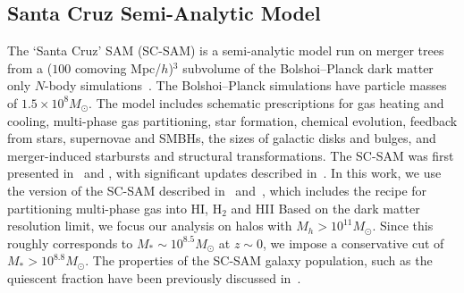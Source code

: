\documentclass[tighten, preprint]{aastex62}
\begin{document}
\subsection{Santa Cruz Semi-Analytic Model} \label{sec:scsam}
The `Santa Cruz' SAM (SC-SAM) is a semi-analytic model run on 
merger trees from a ($100$ comoving Mpc/$h$)$^3$ subvolume of the 
Bolshoi--Planck dark matter only $N$-body simulations~\citep{rodriguez-puebla2016}. 
The Bolshoi--Planck simulations have particle masses of $1.5 \times 10^8 M_\odot$. 
The model includes schematic prescriptions for gas heating and 
cooling, multi-phase gas partitioning, star formation, chemical 
evolution, feedback from stars, supernovae and SMBHs, the sizes 
of galactic disks and 
bulges, and merger-induced starbursts and structural transformations. 
The SC-SAM was first presented in~\cite{somerville1999} and 
\cite{somerville2001}, with significant updates described 
in~\cite{somerville2008, somerville2008a, somerville2012, porter2014, 
popping2014, somerville2015a}. In this work, we use the version of 
the SC-SAM described in~\cite{popping2014} and~\cite{somerville2015a}, 
{\color{red} which includes the \cite{gnedin2011} recipe for partitioning multi-phase
gas into HI, H$_2$ and HII %
Based on the dark matter resolution limit,}
we focus our analysis on halos with $M_h{>}10^{11} M_\odot$.
Since this roughly corresponds to $M_*{\sim}10^{8.5} M_\odot$ at 
$z\sim 0$, we impose a conservative cut of $M_* > 10^{8.8}M_\odot$. 
The properties of the SC-SAM galaxy population, 
such as the quiescent fraction have been previously discussed 
in~\cite{brennan2015,somerville2015b,brennan2017,pandya2017}.

\end{document}
